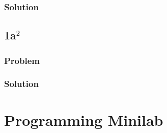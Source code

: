 \documentclass[12pt]{article}
\begin{document}
\subsubsection*{Solution}
\todo[]

\subsection{1a$^2$}
\subsubsection*{Problem}
\subsubsection*{Solution}
\todo[]

\section{Programming Minilab}
\todo[]
\end{document}
